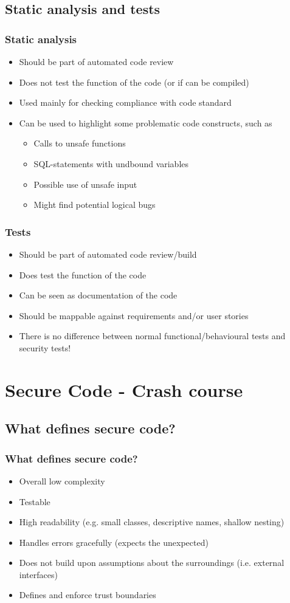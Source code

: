 \documentclass{beamer}
\begin{document}
\subsection{Static analysis and tests}
\begin{frame}
\frametitle{Static analysis}
\begin{itemize}
  \item Should be part of automated code review
  \item Does not test the function of the code (or if can be compiled)
  \item Used mainly for checking compliance with code standard
  \item Can be used to highlight some problematic code constructs, such as
  \begin{itemize}
    \item Calls to unsafe functions
    \item SQL-statements with undbound variables
    \item Possible use of unsafe input
    \item Might find potential logical bugs
  \end{itemize}
\end{itemize}
\end{frame}

\begin{frame}
\frametitle{Tests}
\begin{itemize}
  \item Should be part of automated code review/build
  \item Does test the function of the code
  \item Can be seen as documentation of the code
  \item Should be mappable against requirements and/or user stories
  \item There is no difference between normal functional/behavioural tests and security tests!
\end{itemize}
\end{frame}

\section{Secure Code - Crash course}

\subsection{What defines secure code?}
\begin{frame}
\frametitle{What defines secure code?}
\begin{itemize}
  \item Overall low complexity
  \item Testable
  \item High readability (e.g. small classes, descriptive names, shallow nesting)
  \item Handles errors gracefully (expects the unexpected)
  \item Does not build upon assumptions about the surroundings (i.e. external interfaces)
  \item Defines and enforce trust boundaries
\end{itemize}
\end{frame}
\end{document}
